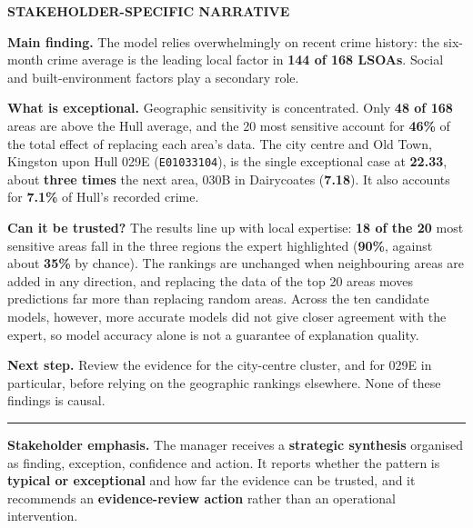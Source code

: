 \begin{tcolorbox}
\begin{minipage}[t]{0.55\linewidth}
{\scriptsize\bfseries STAKEHOLDER-SPECIFIC NARRATIVE}

\vspace{0.8mm}

\footnotesize
\RaggedRight

\textbf{Main finding.} The model relies overwhelmingly on recent crime
history: the six-month crime average is the leading local factor in
\textbf{144 of 168 LSOAs}. Social and built-environment factors play a
secondary role.

\vspace{1.2mm}

\textbf{What is exceptional.} Geographic sensitivity is concentrated. Only
\textbf{48 of 168} areas are above the Hull average, and the 20 most
sensitive account for \textbf{46\%} of the total effect of replacing each
area's data. The city centre and Old Town, Kingston upon Hull 029E
(\texttt{E01033104}), is the single exceptional case at \textbf{22.33},
about \textbf{three times} the next area, 030B in Dairycoates
(\textbf{7.18}). It also accounts for \textbf{7.1\%} of Hull's recorded
crime.

\vspace{1.2mm}

\textbf{Can it be trusted?} The results line up with local expertise:
\textbf{18 of the 20} most sensitive areas fall in the three regions the
expert highlighted (\textbf{90\%}, against about \textbf{35\%} by chance).
The rankings are unchanged when neighbouring areas are added in any
direction, and replacing the data of the top 20 areas moves predictions far
more than replacing random areas. Across the ten candidate models, however,
more accurate models did not give closer agreement with the expert, so
model accuracy alone is not a guarantee of explanation quality.

\vspace{1.2mm}

\textbf{Next step.} Review the evidence for the city-centre cluster, and for
029E in particular, before relying on the geographic rankings elsewhere.
None of these findings is causal.

\end{minipage}

\vspace{2mm}
\hrule
\vspace{1mm}

{\scriptsize
\textbf{Stakeholder emphasis.}
The manager receives a \textbf{strategic synthesis} organised as finding,
exception, confidence and action. It reports whether the pattern is
\textbf{typical or exceptional} and how far the evidence can be trusted, and
it recommends an \textbf{evidence-review action} rather than an operational
intervention.
}

\end{tcolorbox}


